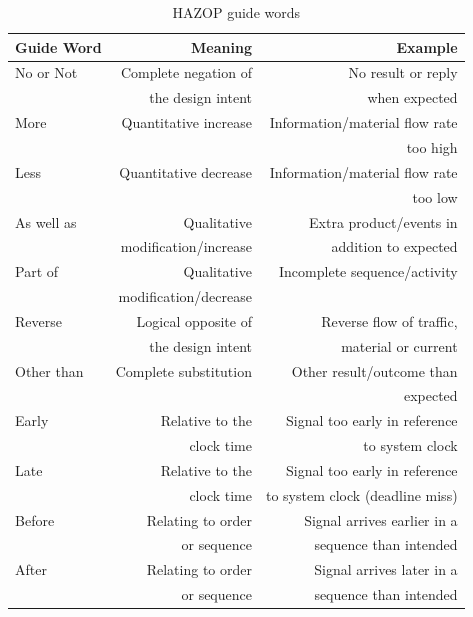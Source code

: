 \documentclass[10pt,oneside]{book}                  %
\begin{document}
\begin{table}[h]
\centering
    \begin{tabular}{ | l | r | r |}
    \hline
    Guide Word & Meaning                                & Example \\ \hline \hline

    No or Not  & Complete negation of  & No result or reply\\ 
               & the design intent     & when expected \\ \hline
               
    More       & Quantitative increase & Information/material flow rate \\
               &                       & too high \\ \hline

    Less       & Quantitative decrease & Information/material flow rate \\
               &                       & too low  \\ \hline

    As well as & Qualitative           & Extra product/events in\\
               & modification/increase & addition to expected \\ \hline

    Part of    & Qualitative           & Incomplete sequence/activity\\
               & modification/decrease & \\ \hline

    Reverse    & Logical opposite of   &  Reverse flow of traffic,\\
               & the design intent     &  material or current\\ \hline
               
    Other than & Complete substitution &  Other result/outcome than \\ 
               &                       &  expected \\ \hline
    Early      & Relative to the       &  Signal too early in reference\\
               & clock time            &  to system clock\\ \hline

    Late       & Relative to the       &  Signal too early in reference \\
               & clock time            &  to system clock (deadline miss)\\ \hline
               
    Before     & Relating to order     &  Signal arrives earlier in a \\
               & or sequence           &  sequence than intended\\ \hline
               
    After      & Relating to order     &  Signal arrives later in a\\
               & or sequence           &  sequence than intended\\ \hline
    \end{tabular}
\caption{HAZOP guide words}
\label{table:hazop_guide_words}
\end{table}
\end{document}
